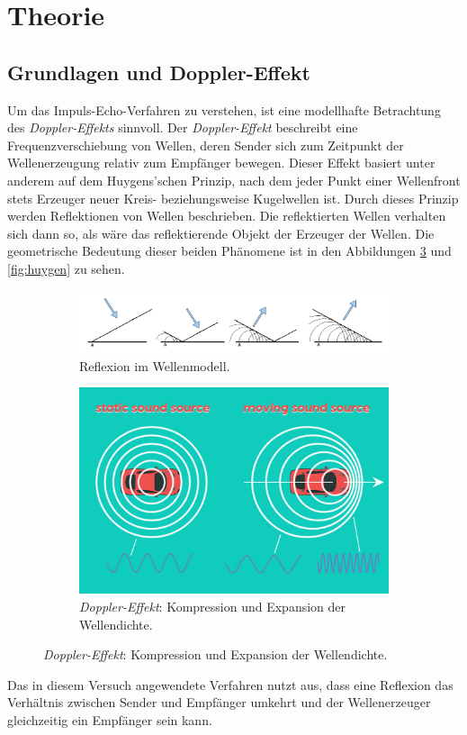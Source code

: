 \section{Theorie}
\label{sec:Theorie}
\subsection{Grundlagen und Doppler-Effekt}
Um das Impuls-Echo-Verfahren zu verstehen, ist eine modellhafte Betrachtung des \textit{Doppler-Effekts} sinnvoll.
Der \textit{Doppler-Effekt} beschreibt eine Frequenzverschiebung von Wellen, deren Sender sich zum Zeitpunkt der Wellenerzeugung relativ zum Empfänger bewegen.
Dieser Effekt basiert unter anderem auf dem Huygens'schen Prinzip, nach dem jeder Punkt einer Wellenfront stets Erzeuger neuer Kreis- beziehungsweise Kugelwellen ist.
Durch dieses Prinzip werden Reflektionen von Wellen beschrieben. Die reflektierten Wellen verhalten sich dann so, als wäre das reflektierende Objekt der Erzeuger der Wellen.
Die geometrische Bedeutung dieser beiden Phänomene ist in den Abbildungen \ref{fig:doppler} und \ref{fig:huygen} zu sehen.

\begin{figure}
    \centering
    \begin{subfigure}{.5\textwidth}
      \centering
      \includegraphics[width=.6\textwidth]{media/Reflexion_im_Wellenmodell.png}
    \caption{Reflexion im Wellenmodell.}
    \label{fig:huygens}
    \end{subfigure}%
    \begin{subfigure}{.5\textwidth}
      \centering
      \includegraphics[width=.4\linewidth]{media/doppler-effect-header.jpg}
      \caption{\textit{Doppler-Effekt}: Kompression und Expansion der Wellendichte.}
      \label{fig:doppler}
    \end{subfigure}
\end{figure}

Das in diesem Versuch angewendete Verfahren nutzt aus, dass eine Reflexion das Verhältnis zwischen Sender und Empfänger umkehrt und der Wellenerzeuger gleichzeitig ein Empfänger sein kann.

